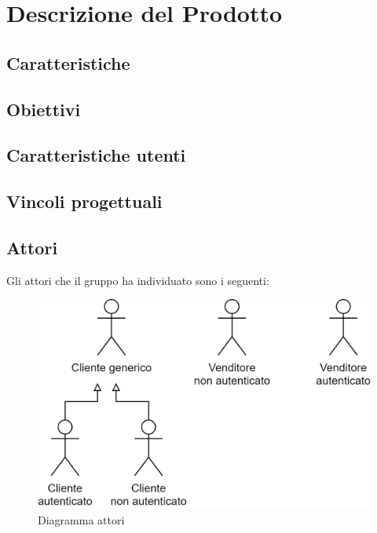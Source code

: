 \section{Descrizione del Prodotto}
\subsection{Caratteristiche}
\subsection{Obiettivi}
\subsection{Caratteristiche utenti}
\subsection{Vincoli progettuali}

\subsection{Attori}
Gli attori che il gruppo ha individuato sono i seguenti:
\begin{figure}[H]
    \centering
    \includegraphics[width=32em]{res/images/UC/attori.png}
    \caption{Diagramma attori} 
\end{figure}
